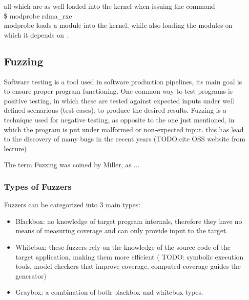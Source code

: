 all which are as well loaded into the kernel when issuing the command \\ \$ modprobe rdma\_rxe \\
modprobe loads a module into the kernel, while also loading the modules on which it depends on \cite{ldd3}.





\subsection{Fuzzing}

Software testing is a tool used in software production pipelines, its main goal is to ensure proper program functioning. One common way to test programs is 
positive testing, in which these are tested against expected inputs under well defined scenarious (test cases), to produce the desired results.
Fuzzing is a technique used for negative testing, as opposite to the one just mentioned, in which the program is put under malformed or non-expected input. this
has lead to the discovery of many bugs in the recent years (TODO:\@ cite OSS website from lecture)

The term Fuzzing was coined by Miller, as ... \

\subsubsection{Types of Fuzzers}
 
Fuzzers can be categorized into 3 main types\cite{fetzer20}:

\begin{itemize}
    \item Blackbox: no knowledge of target program internals, therefore they have no means of measuring coverage and can only provide input to the target.
    \item Whitebox: these fuzzers rely on the knowledge of the source code of the target application, making them more efficient ( TODO: symbolic execution tools, model checkers that improve coverage, computed coverage guides the generator)
    \item Graybox: a combination of both blackbox and whitebox types.
\end{itemize}


